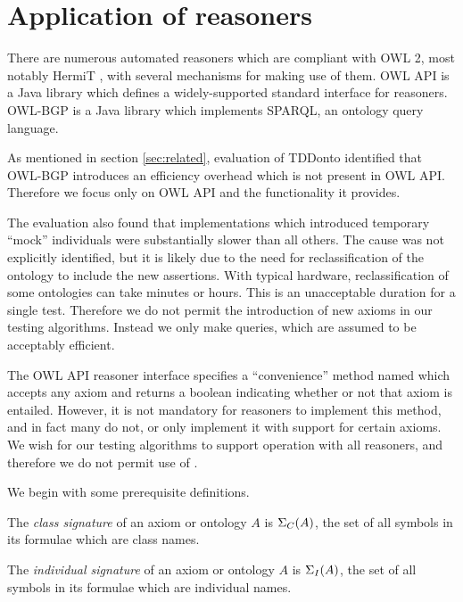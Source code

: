 \documentclass[paper.tex]{subfiles}
\begin{document}
\section{Application of reasoners}
\label{sec:reasoners}

There are numerous automated reasoners which are compliant with OWL 2, most notably HermiT \cite{Glimm:HermiT}, with several mechanisms for making use of them.  OWL API \cite{OWLAPI} is a Java library which defines a widely-supported standard interface for reasoners.  OWL-BGP \cite{OWLBGP} is a Java library which implements SPARQL, an ontology query language.

As mentioned in section \ref{sec:related}, evaluation of TDDonto identified that OWL-BGP introduces an efficiency overhead which is not present in OWL API.  Therefore we focus only on OWL API and the functionality it provides.

The evaluation also found that implementations which introduced temporary ``mock'' individuals were substantially slower than all others.  The cause was not explicitly identified, but it is likely due to the need for reclassification of the ontology to include the new assertions.  With typical hardware, reclassification of some ontologies can take minutes or hours.  This is an unacceptable duration for a single test.  \todo[yuck]  Therefore we do not permit the introduction of new axioms in our testing algorithms.  Instead we only make queries, which are assumed to be acceptably efficient.  

The OWL API reasoner interface specifies a ``convenience'' method named  which accepts any axiom and returns a boolean indicating whether or not that axiom is entailed.  However, it is not mandatory for reasoners to implement this method, and in fact many do not, or only implement it with support for certain axioms.  We wish  for our testing algorithms to support operation with all reasoners, and therefore we do not permit use of .  \todo[requirement]

\todo[connect]

We begin with some prerequisite definitions.

\begin{definition}
  The \emph{class signature} of an axiom or ontology $A$ is $\Sigma_C(A)$, the set of all symbols in its formulae which are class names.
\end{definition}

\begin{definition}
  The \emph{individual signature} of an axiom or ontology $A$ is $\Sigma_I(A)$, the set of all symbols in its formulae which are individual names.
\end{definition}
\end{document}
